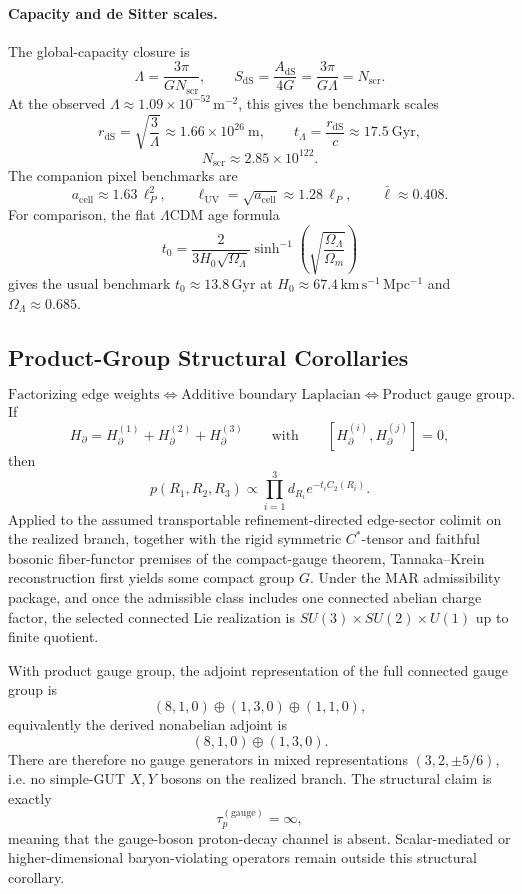 \paragraph{Capacity and de Sitter scales.}
The global-capacity closure is
\[
\Lambda=\frac{3\pi}{G N_{\mathrm{scr}}},
\qquad
S_{\mathrm{dS}}=\frac{A_{\mathrm{dS}}}{4G}=\frac{3\pi}{G\Lambda}=N_{\mathrm{scr}}.
\]
At the observed \(\Lambda\approx 1.09\times 10^{-52}\,\mathrm{m^{-2}}\), this gives the benchmark
scales
\[
r_{\mathrm{dS}}=\sqrt{\frac{3}{\Lambda}}\approx 1.66\times 10^{26}\ \mathrm{m},
\qquad
t_\Lambda=\frac{r_{\mathrm{dS}}}{c}\approx 17.5\ \mathrm{Gyr},
\]
\[
N_{\mathrm{scr}}\approx 2.85\times 10^{122}.
\]
The companion pixel benchmarks are
\[
a_{\mathrm{cell}}\approx 1.63\,\ell_P^2,
\qquad
\ell_{\mathrm{UV}}=\sqrt{a_{\mathrm{cell}}}\approx 1.28\,\ell_P,
\qquad
\bar{\ell}\approx 0.408.
\]
For comparison, the flat \(\Lambda\)CDM age formula
\[
t_0=\frac{2}{3H_0\sqrt{\Omega_\Lambda}}
\sinh^{-1}\!\left(\sqrt{\frac{\Omega_\Lambda}{\Omega_m}}\right)
\]
gives the usual benchmark \(t_0\approx 13.8\,\mathrm{Gyr}\) at
\(H_0\approx 67.4\,\mathrm{km\,s^{-1}\,Mpc^{-1}}\) and \(\Omega_\Lambda\approx 0.685\).

\subsection{Product-Group Structural Corollaries}

\begin{theorem}
\[
\text{Factorizing edge weights}
\Longleftrightarrow
\text{Additive boundary Laplacian}
\Longleftrightarrow
\text{Product gauge group}.
\]
If
\[
H_\partial=H_\partial^{(1)}+H_\partial^{(2)}+H_\partial^{(3)}
\qquad\text{with}\qquad
[H_\partial^{(i)},H_\partial^{(j)}]=0,
\]
then
\[
p(R_1,R_2,R_3)\propto\prod_{i=1}^3 d_{R_i}e^{-t_iC_2(R_i)}.
\]
Applied to the assumed transportable refinement-directed edge-sector colimit on the realized
branch, together with the rigid symmetric
\(C^*\)-tensor and faithful bosonic fiber-functor premises of the compact-gauge theorem,
Tannaka--Krein reconstruction first yields some compact group \(G\). Under the MAR admissibility
package, and once the admissible class includes one connected abelian charge factor, the selected
connected Lie realization is \(SU(3)\times SU(2)\times U(1)\) up to finite quotient.
\end{theorem}

\begin{corollary}
With product gauge group, the adjoint representation of the full connected gauge group is
\[
(8,1,0)\oplus(1,3,0)\oplus(1,1,0),
\]
equivalently the derived nonabelian adjoint is
\[
(8,1,0)\oplus(1,3,0).
\]
There are therefore no gauge generators in mixed representations \((3,2,\pm 5/6)\), i.e. no
simple-GUT \(X,Y\) bosons on the realized branch. The structural claim is exactly
\[
\tau_p^{(\mathrm{gauge})}=\infty,
\]
meaning that the gauge-boson proton-decay channel is absent. Scalar-mediated or
higher-dimensional baryon-violating operators remain outside this structural corollary.
\end{corollary}


